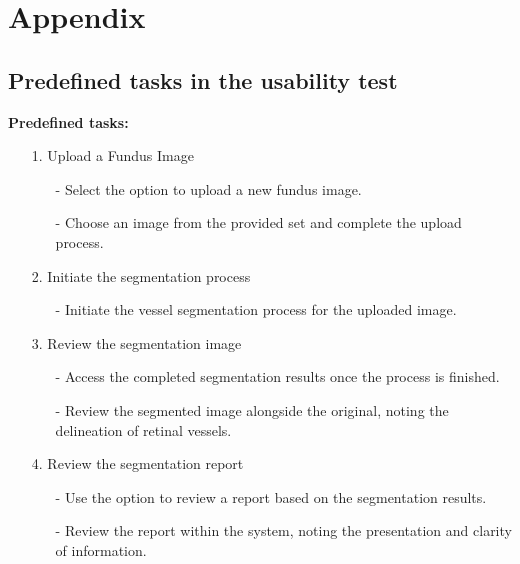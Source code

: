 \documentclass[12pt, titlepage]{article}
\begin{document}
\section{Appendix}
\subsection{Predefined tasks in the usability test}
\label{7_1}
\textbf{Predefined tasks:}
\begin{itemize}
    \item[1.] Upload a Fundus Image
        \begin{itemize}
            \item[-]Select the option to upload a new fundus image.
            \item[-]Choose an image from the provided set and complete the upload process.
        \end{itemize}
    \item[2.] Initiate the segmentation process 
        \begin{itemize}
            \item[-]Initiate the vessel segmentation process for the uploaded image.
        \end{itemize}
    \item[3.] Review the segmentation image 
        \begin{itemize}
            \item[-]Access the completed segmentation results once the process is finished. 
            \item[-]Review the segmented image alongside the original, noting the delineation of retinal vessels.
        \end{itemize}
    \item[4.] Review the segmentation report
        \begin{itemize}
            \item[-] Use the option to review a report based on the segmentation results. 
            \item[-] Review the report within the system, noting the presentation and clarity of information.
        \end{itemize}
\end{itemize}
\end{document}
